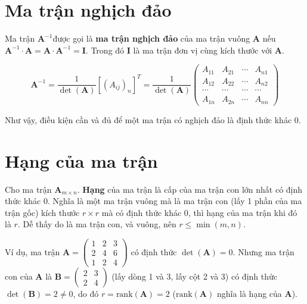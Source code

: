 \documentclass{mynotes}
\begin{document}
\section{Ma trận nghịch đảo}

Ma trận $\bm{A}^{-1}$​ được gọi là \textbf{ma trận nghịch đảo} của ma trận vuông $\bm{A}$ nếu $\bm{A}^{-1} \cdot \bm{A} = \bm{A} \cdot \bm{A}^{-1} = \bm{I}$​. Trong đó $\bm{I}$ là ma trận đơn vị cùng kích thước với $\bm{A}$.

\begin{equation}
    \bm{A}^{-1}=\frac{1}{\det(\bm{A})}[(A_{ij})_n]^T=\frac{1}{\det(\bm{A})}\begin{pmatrix} A_{11} & A_{21} & \cdots & A_{n1} \\ A_{12} & A_{22} & \cdots & A_{n2} \\ \cdots & \cdots & \cdots & \cdots \\ A_{1n} & A_{2n} & \cdots & A_{nn} \end{pmatrix}
\end{equation}

Như vậy, điều kiện cần và đủ để một ma trận có nghịch đảo là định thức khác 0.

\section{Hạng của ma trận}

\begin{definition}
    Cho ma trận $\mathbf{A}_{m \times n}$. \textbf{Hạng} của ma trận là cấp của ma trận con lớn nhất có định thức khác 0. Nghĩa là một ma trận vuông mà là ma trận con (lấy 1 phần của ma trận gốc) kích thước $r \times r$ mà có định thức khác 0, thì hạng của ma trận khi đó là $r$. Dễ thấy do là ma trận con, và vuông, nên $r \leqslant \min(m, n)$.
\end{definition}

Ví dụ, ma trận $\bm{A} = \begin{pmatrix}1 & 2 & 3 \\ 2 & 4 & 6 \\ 1 & 2 & 4\end{pmatrix}$ có định thức $\det(\bm{A}) = 0$. Nhưng ma trận con của $\bm{A}$ là $\bm{B} = \begin{pmatrix}2 & 3 \\ 2 & 4\end{pmatrix}$ (lấy dòng 1 và 3, lấy cột 2 và 3) có định thức $\det(\bm{B}) = 2 \neq 0$, do đó $r = \text{rank}(\bm{A}) = 2$ ($\text{rank}(\bm{A})$ nghĩa là hạng của $\bm{A}$).
\end{document}
